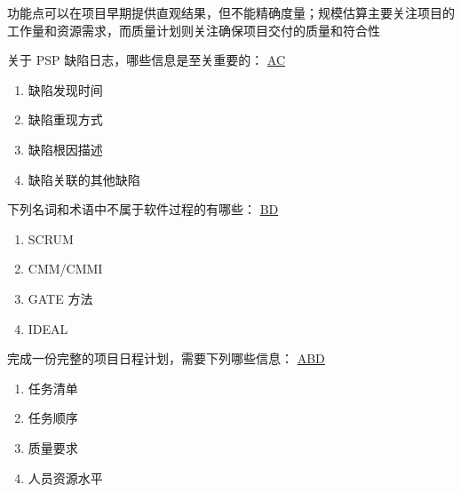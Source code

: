 \begin{solution}
功能点可以在项目早期提供直观结果，但不能精确度量；规模估算主要关注项目的工作量和资源需求，而质量计划则关注确保项目交付的质量和符合性
\end{solution}



\begin{problem}
	关于 PSP 缺陷日志，哪些信息是至关重要的：
	\uline{AC}    
    \vspace{-0.8em}
    \begin{multicols}{2}
        \begin{enumerate}[label=\Alph*.]
            \item 缺陷发现时间
            \item 缺陷重现方式
            \item 缺陷根因描述
            \item 缺陷关联的其他缺陷
        \end{enumerate}
    \end{multicols}
    \vspace{-1em}
\end{problem}



\begin{problem}
	下列名词和术语中不属于软件过程的有哪些：
	\uline{BD}    
    \vspace{-0.8em}
    \begin{multicols}{4}
        \begin{enumerate}[label=\Alph*.]
            \item SCRUM
            \item CMM/CMMI
            \item GATE 方法
            \item IDEAL
        \end{enumerate}
    \end{multicols}
    \vspace{-1em}
\end{problem}




\begin{problem}
	完成一份完整的项目日程计划，需要下列哪些信息：
	\uline{ABD}    
    \vspace{-0.8em}
    \begin{multicols}{4}
        \begin{enumerate}[label=\Alph*.]
            \item 任务清单
            \item 任务顺序
            \item 质量要求
            \item 人员资源水平
        \end{enumerate}
    \end{multicols}
    \vspace{-1em}
\end{problem}



